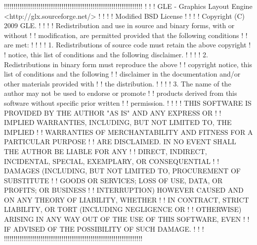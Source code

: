 !!!!!!!!!!!!!!!!!!!!!!!!!!!!!!!!!!!!!!!!!!!!!!!!!!!!!!!!!!!!!!!!!!!!!!!!
!                                                                      !
! GLE - Graphics Layout Engine <http://glx.sourceforge.net/>          !
!                                                                      !
! Modified BSD License                                                 !
!                                                                      !
! Copyright (C) 2009 GLE.                                              !
!                                                                      !
! Redistribution and use in source and binary forms, with or without   !
! modification, are permitted provided that the following conditions   !
! are met:                                                             !
!                                                                      !
!    1. Redistributions of source code must retain the above copyright !
! notice, this list of conditions and the following disclaimer.        !
!                                                                      !
!    2. Redistributions in binary form must reproduce the above        !
! copyright notice, this list of conditions and the following          !
! disclaimer in the documentation and/or other materials provided with !
! the distribution.                                                    !
!                                                                      !
!    3. The name of the author may not be used to endorse or promote   !
! products derived from this software without specific prior written   !
! permission.                                                          !
!                                                                      !
! THIS SOFTWARE IS PROVIDED BY THE AUTHOR "AS IS" AND ANY EXPRESS OR   !
! IMPLIED WARRANTIES, INCLUDING, BUT NOT LIMITED TO, THE IMPLIED       !
! WARRANTIES OF MERCHANTABILITY AND FITNESS FOR A PARTICULAR PURPOSE   !
! ARE DISCLAIMED. IN NO EVENT SHALL THE AUTHOR BE LIABLE FOR ANY       !
! DIRECT, INDIRECT, INCIDENTAL, SPECIAL, EXEMPLARY, OR CONSEQUENTIAL   !
! DAMAGES (INCLUDING, BUT NOT LIMITED TO, PROCUREMENT OF SUBSTITUTE    !
! GOODS OR SERVICES; LOSS OF USE, DATA, OR PROFITS; OR BUSINESS        !
! INTERRUPTION) HOWEVER CAUSED AND ON ANY THEORY OF LIABILITY, WHETHER !
! IN CONTRACT, STRICT LIABILITY, OR TORT (INCLUDING NEGLIGENCE OR      !
! OTHERWISE) ARISING IN ANY WAY OUT OF THE USE OF THIS SOFTWARE, EVEN  !
! IF ADVISED OF THE POSSIBILITY OF SUCH DAMAGE.                        !
!                                                                      !
!!!!!!!!!!!!!!!!!!!!!!!!!!!!!!!!!!!!!!!!!!!!!!!!!!!!!!!!!!!!!!!!!!!!!!!!

